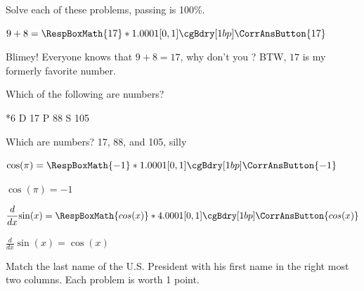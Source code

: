 \documentclass{article}
\begin{document}
\bRTVToks{\currQuiz}

\begin{quiz*}{\currQuiz}
Solve each of these problems, passing is 100\%.
\begin{questions}
    \begin{rtVW}
        \item{} $9+8=\RespBoxMath{17}*{1}{.0001}{[0,1]}\cgBdry[1bp]
      \CorrAnsButton{17}$
        \begin{solution}
            Blimey! Everyone knows that $ 9 + 8 = 17$, why don't you ? BTW, $17$ is my formerly favorite number.
\end{solution}
\end{rtVW}

    \begin{rtVW}
        \item{} Which of the following are numbers?
        \begin{manswers}*{6}
            \bChoices[random=true]
            D\eAns
            17\eAns
            P\eAns
            88\eAns
            S\eAns
            105\eAns
            \eChoices
        \end{manswers}
        \begin{solution}
         Which are  numbers? 17, 88, and 105, silly
\end{solution}
\end{rtVW}

    \begin{rtVW}
  \item{} $ \cos(\pi) = \RespBoxMath{-1}*{1}{.0001}{[0,1]}\cgBdry[1bp]
      \CorrAnsButton{-1} $
\begin{solution}
$ \cos(\pi) = -1 $
\end{solution}
\end{rtVW}

    \begin{rtVW}
\item{} $\displaystyle\frac{d}{dx}{\sin(x)}=\RespBoxMath{cos(x)}*{4}{.0001}{[0,1]}\cgBdry[1bp]
      \CorrAnsButton{cos(x)} $
\begin{solution}
 $\displaystyle\frac{d}{dx}{\sin(x)}= \cos(x) $
\end{solution}
\end{rtVW}

    \begin{rtVW}
\hideCreditMarkup
        \item{} Match the last name of the U.S. President with his first
        name in the right most two columns. Each problem is worth 1 point.


\end{rtVW}
\end{questions}
\end{quiz*}
\end{document}
